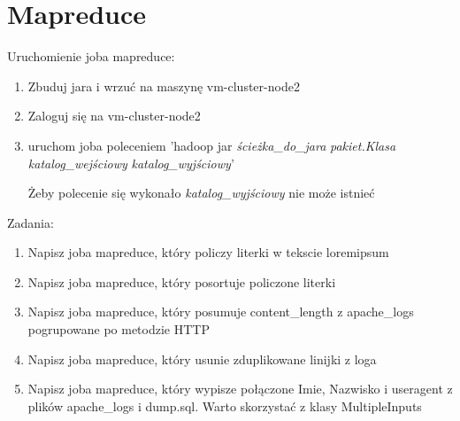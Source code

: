 \documentclass[11pt]{article}
\begin{document}
\section*{Mapreduce}

Uruchomienie joba mapreduce:
\begin{enumerate}
\item Zbuduj jara i wrzuć na maszynę vm-cluster-node2
\item Zaloguj się na vm-cluster-node2
\item uruchom joba poleceniem 'hadoop jar \textit{ścieżka\_do\_jara} \textit{pakiet.Klasa} \textit{katalog\_wejściowy} \textit{katalog\_wyjściowy}'

Żeby polecenie się wykonało \textit{katalog\_wyjściowy} nie może istnieć
\end{enumerate}

Zadania:
\begin{enumerate}
\item Napisz joba mapreduce, który policzy literki w tekscie loremipsum
\item Napisz joba mapreduce, który posortuje policzone literki
\item Napisz joba mapreduce, który posumuje content\_length z apache\_logs pogrupowane po metodzie HTTP
\item Napisz joba mapreduce, który usunie zduplikowane linijki z loga
\item Napisz joba mapreduce, który wypisze połączone Imie, Nazwisko i useragent z plików apache\_logs i dump.sql. Warto skorzystać z klasy MultipleInputs
\end{enumerate}
\end{document}
